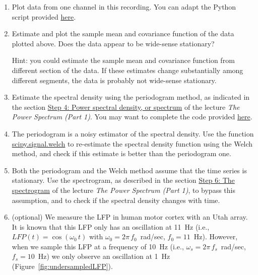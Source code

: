 \documentclass[12pt]{article}
\begin{document}
\begin{enumerate}

    \item Plot data from one channel in this recording. You can adapt the
        Python script provided
        \href{https://github.com/joacorapela/statNeuro2025/blob/master/worksheets/03_spectralTimeSeriesAnalysis/doPlotData.py}{here}.

    \item Estimate and plot the sample mean and covariance function of the
        data plotted above. Does the data appear to be wide-sense stationary?

        Hint: you could estimate the sample mean and covariance function from
        different section of the data. If these estimates change substantially
        among different segments, the data is probably not wide-sense
        stationary.

    \item Estimate the spectral density using the periodogram method, as
        indicated in the section
        \href{https://mark-kramer.github.io/Case-Studies-Python/03.html#step-4-power-spectral-density-or-spectrum}{Step
        4: Power spectral density, or spectrum} of the lecture \emph{The Power
        Spectrum (Part 1)}. You may want to complete the code provided
        \href{https://github.com/joacorapela/statNeuro2025/blob/master/worksheets/03_spectralTimeSeriesAnalysis/doPeriodogram.py}{here}.

    \item The periodogram is a noisy estimator of the spectral
        density. Use the function
        \href{https://docs.scipy.org/doc/scipy/reference/generated/scipy.signal.welch.html#scipy.signal.welch}{scipy.signal.welch} to re-estimate
        the spectral density function using the Welch method, and check if this estimate is better
        than the periodogram one.

    \item Both the periodogram and the Welch method assume that the time series
        is stationary. Use the spectrogram, as described in the section
        \href{https://hub.2i2c.mybinder.org/user/mark-kramer-case-studies-python-vd53gjx8/notebooks/03.ipynb#the-spectrogram}{Step
        6: The spectrogram} of the lecture \emph{The Power Spectrum (Part 1)},
        to bypass this assumption, and to check if the spectral density changes
        with time.

    \item (optional) We measure the LFP in human motor cortex with an Utah array. It is
        known that this LFP only has an oscillation at 11~Hz (i.e.,
        $LFP(t)=\cos(\omega_0\,t)$ with $\omega_0=2\pi\,f_0$~rad/sec,
        $f_0=11$~Hz). However, when we sample this LFP at a frequency of 10~Hz
        (i.e., $\omega_s=2\pi\,f_s$~rad/sec, $f_s=10$~Hz) we only observe an
        oscillation at 1~Hz (Figure~\ref{fig:undersampledLFP}).


\end{enumerate}
\end{document}
